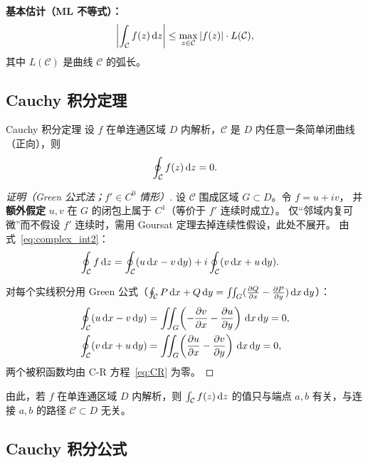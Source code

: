 \textbf{基本估计（ML 不等式）：}
\begin{equation}
  \left|\int_{\mathcal{C}} f(z)\,\mathrm{d} z\right|
  \le \max_{z\in\mathcal{C}}|f(z)|\cdot L(\mathcal{C}),
  \label{eq:ML}
\end{equation}
其中 $L(\mathcal{C})$ 是曲线 $\mathcal{C}$ 的弧长。

\subsection{Cauchy 积分定理}

\begin{theorem}{Cauchy 积分定理}{}
\label{thm:cauchy_theorem}
设 $f$ 在单连通区域 $D$ 内解析，$\mathcal{C}$ 是 $D$ 内任意一条简单闭曲线（正向），则
\begin{equation}
    \oint_{\mathcal{C}} f(z)\,\mathrm{d} z = 0.
  \label{eq:cauchy_theorem}
\end{equation}
\end{theorem}

\begin{proof}[证明（Green 公式法；$f'\in C^0$ 情形）]
设 $\mathcal{C}$ 围成区域 $G\subset D$。令 $f=u+iv$，
并\textbf{额外假定} $u,v$ 在 $G$ 的闭包上属于 $C^1$（等价于 $f'$ 连续时成立）。
仅“邻域内复可微”而不假设 $f'$ 连续时，需用 Goursat 定理去掉连续性假设，此处不展开。
由式~\eqref{eq:complex_int2}：
\begin{align}
  \oint_{\mathcal{C}} f\,\mathrm{d} z
  &= \oint_{\mathcal{C}}(u\,\mathrm{d} x-v\,\mathrm{d} y)
   + i\oint_{\mathcal{C}}(v\,\mathrm{d} x+u\,\mathrm{d} y).
\end{align}

对每个实线积分用 Green 公式（$\oint_{\mathcal{C}}P\,\mathrm{d} x+Q\,\mathrm{d} y
=\iint_G(\frac{\partial Q}{\partial x}-\frac{\partial P}{\partial y})\,\mathrm{d} x\,\mathrm{d} y$）：
\begin{align}
  \oint_{\mathcal{C}}(u\,\mathrm{d} x-v\,\mathrm{d} y)
  &= \iint_G\!\left(-\frac{\partial v}{\partial x}-\frac{\partial u}{\partial y}\right)\,\mathrm{d} x\,\mathrm{d} y = 0,\\
  \oint_{\mathcal{C}}(v\,\mathrm{d} x+u\,\mathrm{d} y)
  &= \iint_G\!\left(\frac{\partial u}{\partial x}-\frac{\partial v}{\partial y}\right)\,\mathrm{d} x\,\mathrm{d} y = 0,
\end{align}
两个被积函数均由 C-R 方程~\eqref{eq:CR} 为零。
\end{proof}

由此，若 $f$ 在单连通区域 $D$ 内解析，则 $\int_{\mathcal{C}}f(z)\,\mathrm{d} z$
的值只与端点 $a,b$ 有关，与连接 $a,b$ 的路径 $\mathcal{C}\subset D$ 无关。

\subsection{Cauchy 积分公式}

